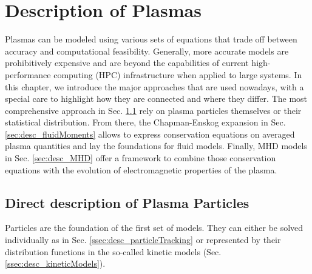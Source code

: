 \chapter{Description of Plasmas}
\label{chap:PlasmaSimulations}

Plasmas can be modeled using various sets of equations that trade off between accuracy and computational feasibility. Generally, more accurate models are prohibitively expensive and are beyond the capabilities of current high-performance computing (HPC) infrastructure when applied to large systems. In this chapter, we introduce the major approaches that are used nowadays, with a special care to highlight how they are connected and where they differ. The most comprehensive approach in Sec. \ref{sec:desc_directDesciption} rely on plasma particles themselves or their statistical distribution. From there, the Chapman-Enskog expansion in Sec. \ref{sec:desc_fluidMoments} allows to express conservation equations on averaged plasma quantities and lay the foundations for fluid models. Finally, MHD models in Sec. \ref{sec:desc_MHD} offer a framework to combine those conservation equations with the evolution of electromagnetic properties of the plasma. 

\section{Direct description of Plasma Particles}
\label{sec:desc_directDesciption}
Particles are the foundation of the first set of models. They can either be solved individually as in Sec. \ref{ssec:desc_particleTracking} or represented by their distribution functions in the so-called kinetic models (Sec. \ref{ssec:desc_kineticModels}).

